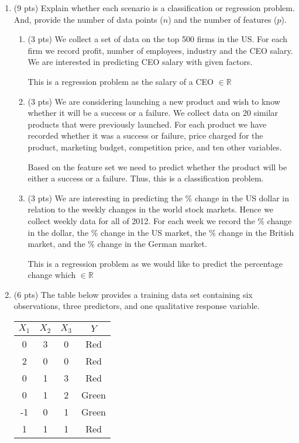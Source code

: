 \documentclass[a4paper]{article}
\theoremstyle{definition}
\newcommand{\rr}{\mathbb{R}}
\newenvironment{soln}{
    \leavevmode\color{blue}\ignorespaces
}{}
\begin{document}
\begin{enumerate}
\item (9 pts) Explain whether each scenario is a classification or regression problem. And, provide the number of data points ($n$) and the number of features ($p$).

\begin{enumerate}
	\item (3 pts) We collect a set of data on the top 500 firms in the US. For each firm we record profit, number of employees, industry and the CEO salary. We are interested in predicting CEO salary with given factors.
	
	\begin{soln}  This is a regression problem as the salary of a CEO $\in \rr$ \end{soln}
	
	\item (3 pts) We are considering launching a new product and wish to know whether it will be a success or a failure. We collect data on 20 similar products that were previously launched. For each product we have recorded whether it was a success or failure, price charged for the product, marketing budget, competition price, and ten other variables.
	
	\begin{soln}  Based on the feature set we need to predict whether the product will be either a success or a failure. Thus, this is a classification problem.\end{soln}
	
	\item (3 pts) We are interesting in predicting the \% change in the US dollar in relation to the weekly changes in the world stock markets. Hence we collect weekly data for all of 2012. For each week we record the \% change in the dollar, the \% change in the US market, the \% change in the British market, and the \% change in the German market.
	
	\begin{soln} This is a regression problem as we would like to predict the percentage change which $\in \rr$ \end{soln}
	
\end{enumerate}

\item (6 pts) The table below provides a training data set containing six observations, three predictors, and one qualitative response variable.

\begin{center}
	\begin{tabular}{ c  c  c  c}
		\hline
		$X_{1}$ & $X_{2}$ & $X_{3}$ & $Y$ \\ \hline
		0 & 3 & 0 & Red \\
		2 & 0 & 0 & Red \\
		0 & 1 & 3 & Red \\
		0 & 1 & 2 & Green \\
		-1 & 0 & 1 & Green \\
		1 & 1 & 1 & Red  \\
		\hline
	\end{tabular}
\end{center}


\end{enumerate}
\end{document}
